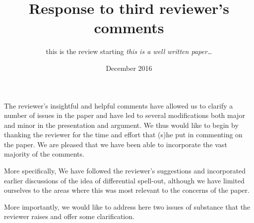 \documentclass[11pt]{article}
\begin{document}
\title{Response to third reviewer's comments}
\author{this is the review starting \textit{this is a well written paper\ldots}}
\date{December 2016}

\maketitle


The reviewer's insightful and helpful comments have allowed us to clarify a number of issues in the paper and have led to several modifications both major and minor in the presentation and argument. We thus would like to begin by thanking the reviewer for the time and effort that (s)he put in commenting on the paper. We are pleased that we have been able to incorporate the vast majority of the comments.

More specifically, We have followed the reviewer's suggestions and incorporated earlier discussions of the idea of differential spell-out, although we have limited ourselves to the areas where this was most relevant to the concerns of the paper.

More importantly, we would like to address here two issues of substance that the reviewer raises and offer some clarification.
\end{document}
